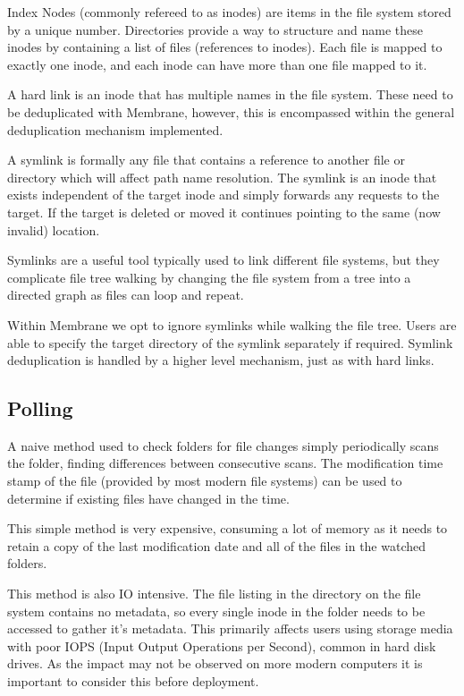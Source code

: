 \documentclass[11pt, a4paper, twocolumn, twoside]{report}
\begin{document}
Index Nodes (commonly refereed to as inodes) are items in the file system stored by a unique number. Directories provide a way to structure and name these inodes by containing a list of files (references to inodes). Each file is mapped to exactly one inode, and each inode can have more than one file mapped to it. \citep{bar2001linux}

A hard link is an inode that has multiple names in the file system. These need to be deduplicated with Membrane, however, this is encompassed within the general deduplication mechanism implemented.

A symlink is formally any file that contains a reference to another file or directory which will affect path name resolution. The symlink is an inode that exists independent of the target inode and simply forwards any requests to the target. If the target is deleted or moved it continues pointing to the same (now invalid) location. \citep{yue2011unix}

Symlinks are a useful tool typically used to link different file systems, but they complicate file tree walking by changing the file system from a tree into a directed graph as files can loop and repeat.

Within Membrane we opt to ignore symlinks while walking the file tree. Users are able to specify the target directory of the symlink separately if required. Symlink deduplication is handled by a higher level mechanism, just as with hard links.

\subsection{Polling}

A naive method used to check folders for file changes simply periodically scans the folder, finding differences between consecutive scans. The modification time stamp of the file (provided by most modern file systems) can be used to determine if existing files have changed in the time.

This simple method is very expensive, consuming a lot of memory as it needs to retain a copy of the last modification date and all of the files in the watched folders.

This method is also IO intensive. The file listing in the directory on the file system contains no metadata, so every single inode in the folder needs to be accessed to gather it's metadata. This primarily affects users using storage media with poor IOPS (Input Output Operations per Second), common in hard disk drives. As the impact may not be observed on more modern computers it is important to consider this before deployment. \citep{mansurov2017storage}
\end{document}

